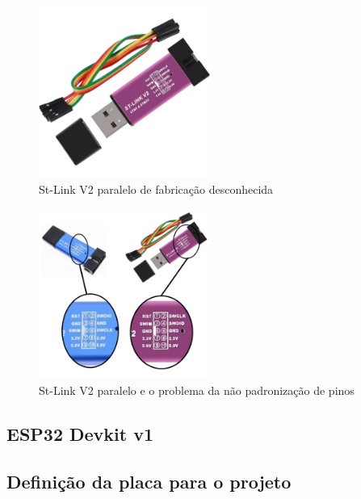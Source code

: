 \begin{figure}[ht]
	\centering
	\includegraphics[width=0.5\textwidth]{figures/stlinkv2_cheap}
	\caption{St-Link V2 paralelo de fabricação desconhecida}
    \label{stlinkv2_cheap}
\end{figure}


\begin{figure}[htb]
	\centering
	\includegraphics[width=0.5\textwidth]{figures/stlinkv2_cheap_pin_diff}
	\caption{St-Link V2 paralelo e o problema da não padronização de pinos}
    \label{stlinkv2_cheap_pin_diff}
\end{figure}


\subsection{ESP32 Devkit v1}



\subsection{Definição da placa para o projeto}





